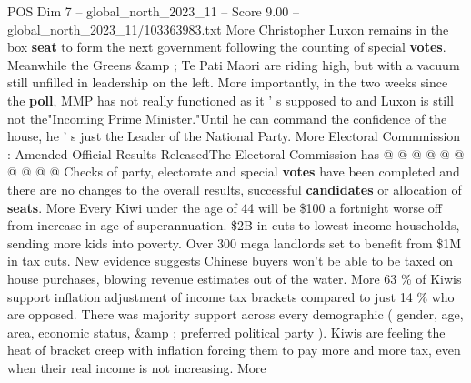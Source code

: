 \begin{textsample}{POS Dim 7 – global\_north\_2023\_11 – Score 9.00 – global\_north\_2023\_11/103363983.txt}
More Christopher Luxon remains in the box \textbf{seat} to form the next government following the counting of special \textbf{votes}.
Meanwhile the Greens \&amp ; Te Pati Maori are riding high, but with a vacuum still unfilled in leadership on the left.
More importantly, in the two weeks since the \textbf{poll}, MMP has not really functioned as it ' s supposed to and Luxon is still not the"Incoming Prime Minister."Until he can command the confidence of the house, he ' s just the Leader of the National Party.
More Electoral Commmission : Amended Official Results ReleasedThe Electoral Commission has @ @ @ @ @ @ @ @ @ @ Checks of party, electorate and special \textbf{votes} have been completed and there are no changes to the overall results, successful \textbf{candidates} or allocation of \textbf{seats}.
More Every Kiwi under the age of 44 will be \$100 a fortnight worse off from increase in age of superannuation. \$2B in cuts to lowest income households, sending more kids into poverty.
Over 300 mega landlords set to benefit from \$1M in tax cuts.
New evidence suggests Chinese buyers won't be able to be taxed on house purchases, blowing revenue estimates out of the water.
More 63 \% of Kiwis support inflation adjustment of income tax brackets compared to just 14 \% who are opposed.
There was majority support across every demographic ( gender, age, area, economic status, \&amp ; preferred political party ).
Kiwis are feeling the heat of bracket creep with inflation forcing them to pay more and more tax, even when their real income is not increasing.
More

\end{textsample}
